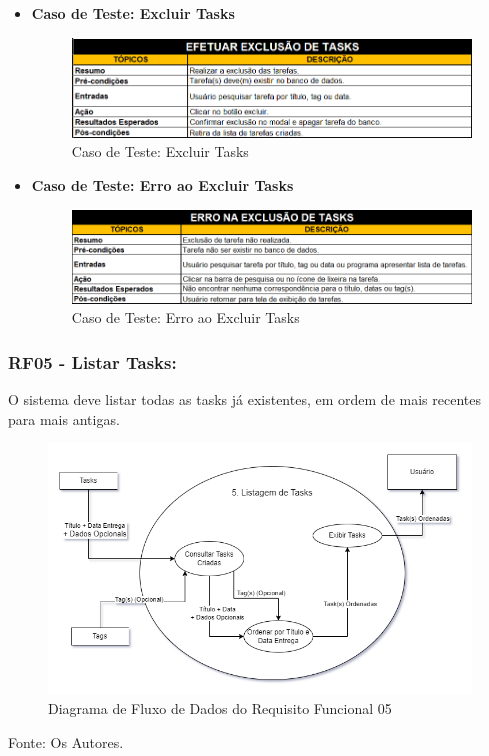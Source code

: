 \documentclass[a4paper,12pt]{article}
\begin{document}
\begin{itemize}
	\item\textbf{Caso de Teste: Excluir Tasks}
	\begin{figure}
		\centering
		\includegraphics[scale=0.75]{UnitTest/trueCase/deleteTask.png}
		\caption{Caso de Teste: Excluir Tasks}
	\end{figure}
	\item\textbf{Caso de Teste: Erro ao Excluir Tasks}
	\begin{figure}
		\centering
		\includegraphics[scale=0.75]{UnitTest/falseCase/deleteTask.png}
		\caption{Caso de Teste: Erro ao Excluir Tasks}
	\end{figure}
\end{itemize}

\pagebreak
\subsubsection{RF05 - Listar Tasks:}
O sistema deve listar todas as tasks já existentes, em ordem de mais recentes para mais antigas.
\begin{figure}[H]
	\centering
	\includegraphics[scale=0.45]{DFDs/RF05.drawio.png}
	\caption{Diagrama de Fluxo de Dados do Requisito Funcional 05}
\end{figure}
\noindent Fonte: Os Autores.
\end{document}
